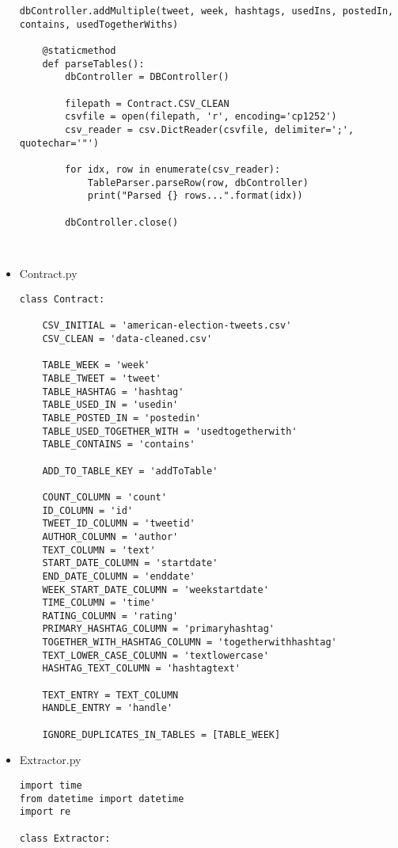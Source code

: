 \begin{itemize}
\begin{lstlisting}[style=py]
		dbController.addMultiple(tweet, week, hashtags, usedIns, postedIn, contains, usedTogetherWiths)

	@staticmethod
	def parseTables():
		dbController = DBController()

		filepath = Contract.CSV_CLEAN
		csvfile = open(filepath, 'r', encoding='cp1252')
		csv_reader = csv.DictReader(csvfile, delimiter=';', quotechar='"')

		for idx, row in enumerate(csv_reader):
		    TableParser.parseRow(row, dbController)
		    print("Parsed {} rows...".format(idx))

		dbController.close()



\end{lstlisting}

\item Contract.py \\

\begin{lstlisting}[style=py]
class Contract:

	CSV_INITIAL = 'american-election-tweets.csv'
	CSV_CLEAN = 'data-cleaned.csv'

	TABLE_WEEK = 'week'
	TABLE_TWEET = 'tweet'
	TABLE_HASHTAG = 'hashtag'
	TABLE_USED_IN = 'usedin'
	TABLE_POSTED_IN = 'postedin'
	TABLE_USED_TOGETHER_WITH = 'usedtogetherwith'
	TABLE_CONTAINS = 'contains'

	ADD_TO_TABLE_KEY = 'addToTable'

	COUNT_COLUMN = 'count'
	ID_COLUMN = 'id'
	TWEET_ID_COLUMN = 'tweetid'
	AUTHOR_COLUMN = 'author'
	TEXT_COLUMN = 'text'
	START_DATE_COLUMN = 'startdate'
	END_DATE_COLUMN = 'enddate'
	WEEK_START_DATE_COLUMN = 'weekstartdate'
	TIME_COLUMN = 'time'
	RATING_COLUMN = 'rating'
	PRIMARY_HASHTAG_COLUMN = 'primaryhashtag'
	TOGETHER_WITH_HASHTAG_COLUMN = 'togetherwithhashtag'
	TEXT_LOWER_CASE_COLUMN = 'textlowercase'
	HASHTAG_TEXT_COLUMN = 'hashtagtext'

	TEXT_ENTRY = TEXT_COLUMN
	HANDLE_ENTRY = 'handle'
	
	IGNORE_DUPLICATES_IN_TABLES = [TABLE_WEEK]
\end{lstlisting}

\item Extractor.py \\

\begin{lstlisting}[style=py]
import time
from datetime import datetime
import re

class Extractor:


\end{lstlisting}
\end{itemize}
